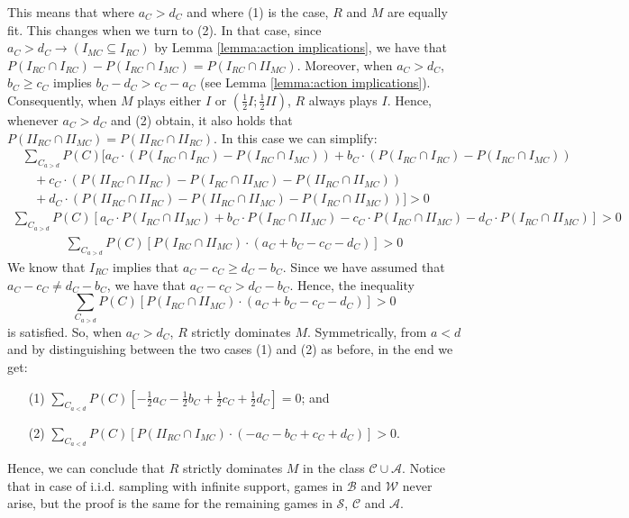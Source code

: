 \documentclass[fleqn,reqno,11pt]{article}
\begin{document}
\noindent This means that where $a_{C}>d_{C}$ and
where (1) is the case, $R$ and $M$ are equally fit. This changes when we turn to (2). In that
case, since $a_{C}>d_{C}\rightarrow(I_{MC}\subseteq I_{RC})$ by Lemma \ref{lemma:action implications}, we have that
$P(I_{RC} \cap I_{RC})-P(I_{RC}\cap I_{MC})=P(I_{RC}\cap II_{MC})$. Moreover, when $a_{C}>d_{C}$, $b_{C}\geq c_{C}$ implies
  $b_{C}-d_{C}>c_{C}-a_{C}$ (see Lemma \ref{lemma:action implications}). Consequently, when $M$ plays either $I$ or $  (\frac{1}{2}I;\frac{1}{2}II)$, $R$ always plays $I$. Hence, whenever $a_{C}>d_{C}$ and (2) obtain, it also holds that $P(II_{RC}\cap II_{MC})=P(II_{RC} \cap II_{RC})$. In this case we can simplify:
\begin{align*}
& \textstyle{\sum_{C_{a>d}}} P(C)[a_{C} \cdot (P(I_{RC}\cap I_{RC}) - P(I_{RC}\cap I_{MC})) + b_{C} \cdot  (P(I_{RC}\cap I_{RC})- P(I_{RC}\cap I_{MC})) \\
& \ \ \ \ + c_{C} \cdot (P(II_{RC}\cap II_{RC})- P(I_{RC}\cap II_{MC})- P(II_{RC}\cap II_{MC})) \\
& \ \ \ \ + d_{C} \cdot (P(II_{RC}\cap II_{RC})- P(II_{RC}\cap II_{MC})- P(I_{RC}\cap II_{MC}))]> 0
\end{align*}
\begin{align*}
\textstyle{\sum_{C_{a>d}}} P(C)[a_{C} \cdot P(I_{RC}\cap II_{MC}) + b_{C} \cdot  P(I_{RC}\cap II_{MC}) - c_{C} \cdot P(I_{RC}\cap II_{MC}) - d_{C} \cdot P(I_{RC}\cap II_{MC})]> 0
\end{align*}
\begin{align*}
\textstyle{\sum_{C_{a>d}}} P(C)[P(I_{RC}\cap II_{MC})\cdot (a_{C} + b_{C} - c_{C} - d_{C})]> 0
\end{align*}
\noindent We know that $I_{RC}$ implies that $a_{C}-c_{C}\geq d_{C}-b_{C}$.
Since we have assumed that $a_{C}-c_{C}\neq d_{C}-b_{C}$, we have that
$a_{C}-c_{C} > d_{C}-b_{C}$. Hence, the inequality
$$\sum_{C_{a>d}} P(C)[P(I_{RC}\cap II_{MC})\cdot (a_{C} + b_{C} - c_{C} - d_{C})]> 0$$
is satisfied. So, when $a_{C}>d_{C}$, $R$
strictly dominates $M$. Symmetrically, from $a<d$ and by distinguishing between the two cases
(1) and (2) as before, in the end we get:
\begin{itemize}
\item[(1)] $\sum_{C_{a<d}} P(C)[-\frac{1}{2}a_{C}- \frac{1}{2}b_{C} + \frac{1}{2}c_{C} + \frac{1}{2}d_{C}]= 0$; and
\item[(2)] $\sum_{C_{a<d}} P(C)[P(II_{RC}\cap I_{MC})\cdot (-a_{C} - b_{C} + c_{C} + d_{C})]> 0$.
\end{itemize}
\noindent Hence, we can conclude that $R$ strictly dominates $M$ in the class
$\mathcal{C}\cup\mathcal{A}$. Notice that in case of i.i.d. sampling with infinite support,
games in $\mathcal{B} $ and $\mathcal{W} $ never arise, but the proof is the same for the
remaining games in $\mathcal{S}$, $\mathcal{C} $ and $\mathcal{A}$.
\end{document}
